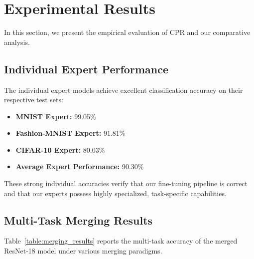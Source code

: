 \documentclass{article}
\theoremstyle{plain}
\theoremstyle{definition}
\theoremstyle{remark}
\begin{document}
\section{Experimental Results}
\label{sec:results}

In this section, we present the empirical evaluation of CPR and our comparative analysis.

\subsection{Individual Expert Performance}
The individual expert models achieve excellent classification accuracy on their respective test sets:
\begin{itemize}
\item \textbf{MNIST Expert:} 99.05\%
\item \textbf{Fashion-MNIST Expert:} 91.81\%
\item \textbf{CIFAR-10 Expert:} 80.03\%
\item \textbf{Average Expert Performance:} 90.30\%
\end{itemize}

These strong individual accuracies verify that our fine-tuning pipeline is correct and that our experts possess highly specialized, task-specific capabilities.

\subsection{Multi-Task Merging Results}
Table~\ref{table:merging_results} reports the multi-task accuracy of the merged ResNet-18 model under various merging paradigms.
\end{document}
